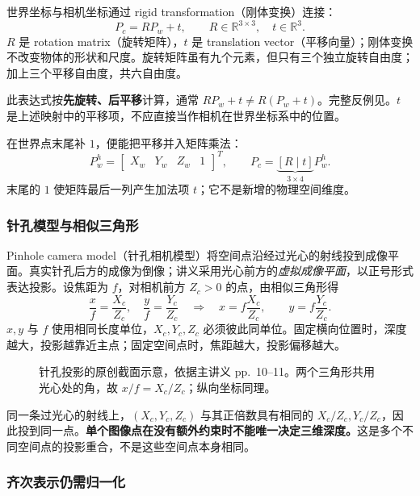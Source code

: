 世界坐标与相机坐标通过 rigid transformation（刚体变换）连接：
\[
  \boxed{P_c=RP_w+t},\qquad
  R\in\mathbb R^{3\times3},\quad t\in\mathbb R^3.
\]
$R$ 是 rotation matrix（旋转矩阵），$t$ 是 translation vector（平移向量）；刚体变换不改变物体的形状和尺度。旋转矩阵虽有九个元素，但只有三个独立旋转自由度；加上三个平移自由度，共六自由度。

此表达式按\textbf{先旋转、后平移}计算，通常 $RP_w+t\ne R(P_w+t)$。完整反例见。$t$ 是上述映射中的平移项，不应直接当作相机在世界坐标系中的位置。

在世界点末尾补 $1$，便能把平移并入矩阵乘法：
\[
  P_w^h=\begin{bmatrix}X_w&Y_w&Z_w&1\end{bmatrix}^{T},
  \qquad
  P_c=\underbrace{[R\mid t]}_{3\times4}P_w^h.
\]
末尾的 $1$ 使矩阵最后一列产生加法项 $t$；它不是新增的物理空间维度。


\subsubsection*{针孔模型与相似三角形}

Pinhole camera model（针孔相机模型）将空间点沿经过光心的射线投到成像平面。真实针孔后方的成像为倒像；讲义采用光心前方的\emph{虚拟成像平面}，以正号形式表达投影。设焦距为 $f$，对相机前方 $Z_c>0$ 的点，由相似三角形得
\[
  \frac{x}{f}=\frac{X_c}{Z_c},\quad
  \frac{y}{f}=\frac{Y_c}{Z_c}
  \quad\Longrightarrow\quad
  \boxed{x=f\frac{X_c}{Z_c},\qquad y=f\frac{Y_c}{Z_c}}.
\]
$x,y$ 与 $f$ 使用相同长度单位，$X_c,Y_c,Z_c$ 必须彼此同单位。固定横向位置时，深度越大，投影越靠近主点；固定空间点时，焦距越大，投影偏移越大。

\begin{figure}[htbp]
  \centering
  
  \caption{针孔投影的原创截面示意，依据主讲义 pp.~10--11。两个三角形共用光心处的角，故 $x/f=X_c/Z_c$；纵向坐标同理。}
  \label{fig:sc4061-l11-projection}
\end{figure}

同一条过光心的射线上，$(X_c,Y_c,Z_c)$ 与其正倍数具有相同的 $X_c/Z_c,Y_c/Z_c$，因此投到同一点。\textbf{单个图像点在没有额外约束时不能唯一决定三维深度。}这是多个不同空间点的投影重合，不是这些空间点本身相同。

\subsubsection*{齐次表示仍需归一化}

